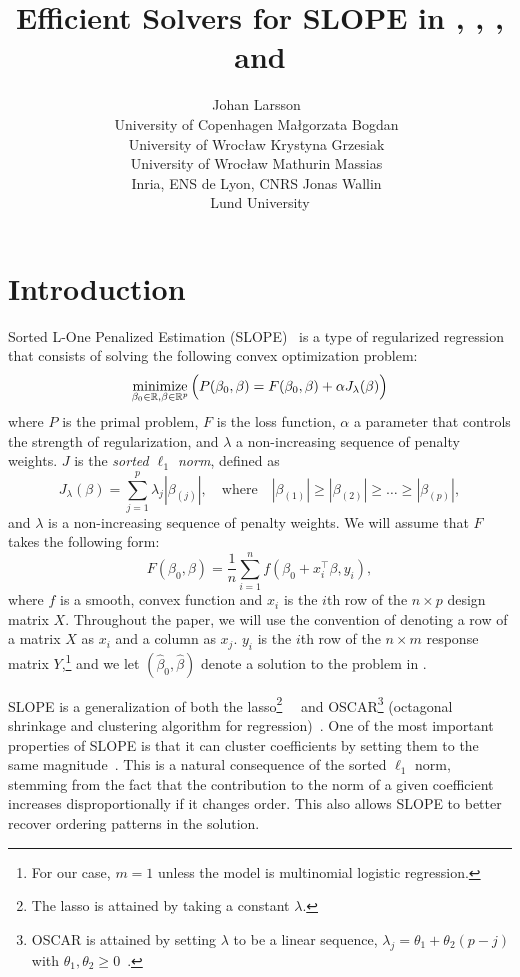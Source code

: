 \documentclass[article]{jss}
\author{
  Johan Larsson~\orcidlink{0000-0002-4029-5945}\\University of Copenhagen
  \And
  Ma\l{}gorzata Bogdan~\orcidlink{0000-0001-6355-8261}\\University of Wroc\l{}aw
  \And
  Krystyna Grzesiak~\orcidlink{0000-0003-2581-7722}\\University of Wroc\l{}aw
  \AND
  Mathurin Massias~\orcidlink{0000-0002-8950-0356}\\Inria, ENS de Lyon, CNRS
  \And
  Jonas Wallin~\orcidlink{0000-0003-0381-6593}\\Lund University
}
\title{Efficient Solvers for SLOPE in \proglang{R}, \proglang{Python}, \proglang{Julia}, and \proglang{C++}}
\let\Cref\crtCref
\begin{document}
\section{Introduction}

Sorted L-One Penalized Estimation
(SLOPE)~\citep{bogdan2013,zeng2014,bogdan2015} is a type of regularized
regression that consists of solving the following convex optimization problem:
\begin{equation}
  \label{eq:slope}
  \operatorname*{minimize}_{\beta_0 \in \mathbb{R},\beta \in \mathbb{R}^p}
  \Big(
  P(\beta_0,\beta)
  = F(\beta_0, \beta) + \alpha J_{\lambda}(\beta)
  \Big)
\end{equation}
where \(P\) is the primal problem, \(F\) is the loss function, \(\alpha\) a parameter
that controls the strength of regularization, and \(\lambda\) a non-increasing sequence of penalty weights. \(J\) is the
\emph{sorted $\ell_1$ norm}, defined as
\begin{equation}
  \label{eq:sl1}
  J_{\lambda}(\beta) = \sum_{j=1}^p \lambda_j |\beta_{(j)}|, \quad
  \text{where}\quad |\beta_{(1)}| \geq |\beta_{(2)}| \geq \ldots \geq
  |\beta_{(p)}|,
\end{equation}
and \(\lambda\) is a non-increasing sequence of penalty weights. We will
assume that \(F\) takes the following form:
\[
  F(\beta_0, \beta) = \frac{1}{n} \sum_{i=1}^n f(\beta_0 + x_i^\intercal \beta, y_i),
\]
where \(f\) is a smooth, convex function and \(x_i\) is the \(i\)th row of the
\(n \times p\) design matrix \(X\). Throughout the paper, we will use the
convention of denoting a row of a matrix \(X\) as \(x_i\) and a column as
\(x_j\). \(y_i\) is the \(i\)th row of the \(n \times m\) response matrix
\(Y\),\footnote{For our case, \(m = 1\) unless the model is multinomial
  logistic regression.}
and we let \((\hat{\beta}_0,
\hat{\beta})\) denote a solution to the problem in \Cref{eq:slope}.

SLOPE is a generalization of both the lasso\footnote{The lasso is attained by
  taking a constant
  \(\lambda\).}~~\citep{santosa1986,donoho1994,donoho1995,tibshirani1996} and
OSCAR\footnote{OSCAR is attained by setting \(\lambda\) to be a linear
  sequence, \(\lambda_j = \theta_1 + \theta_2(p - j)\) with \(\theta_1,
  \theta_2 \geq 0\)~\citep{figueiredo2014}.} (octagonal shrinkage and clustering
algorithm for regression)~\citep{bondell2008}.
One of the most important properties of SLOPE is that it can cluster coefficients by
setting them to the same magnitude~\citep{figueiredo2016,bogdan2022}. This is a natural
consequence of the sorted \(\ell_1\) norm, stemming from the fact that
the contribution to the norm of a given coefficient increases disproportionally if it
changes order. This also allows SLOPE to better recover ordering patterns
in the solution.
\end{document}
